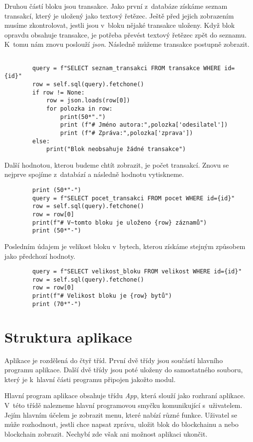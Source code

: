 \documentclass[12pt]{report}			%
\begin{document}
{Druhou částí bloku jsou transakce. Jako první z~databáze získáme seznam transakcí, který je uložený jako textový řetězec. Ještě před jejich zobrazením musíme zkontrolovat, jestli jsou v~bloku nějaké transakce uloženy. Když blok opravdu obsahuje transakce, je potřeba převést textový řetězec zpět do seznamu. K~tomu nám znovu poslouží \textit{json}. Následně můžeme transakce postupně zobrazit.
\begin{lstlisting}        
        
        query = f"SELECT seznam_transakci FROM transakce WHERE id={id}"
        row = self.sql(query).fetchone()
        if row != None:
            row = json.loads(row[0]) 
            for polozka in row:
                print(50*".")
                print (f"# Jméno autora:",polozka['odesilatel'])
                print (f"# Zpráva:",polozka['zprava'])
        else:
            print("Blok neobsahuje žádné transakce")
\end{lstlisting}
Další hodnotou, kterou budeme chtít zobrazit, je počet transakcí. Znovu se nejprve spojíme z~databází a následně hodnotu vytiskneme.

\begin{lstlisting}
        print (50*"-")
        query = f"SELECT pocet_transakci FROM pocet WHERE id={id}" 
        row = self.sql(query).fetchone()
        row = row[0]
        print(f"# V~tomto bloku je uloženo {row} záznamů")
        print (50*"-")
\end{lstlisting}

Posledním údajem je velikost bloku v~bytech, kterou získáme stejným způsobem jako předchozí hodnoty.
\begin{lstlisting}
        query = f"SELECT velikost_bloku FROM velikost WHERE id={id}" 
        row = self.sql(query).fetchone()
        row = row[0]
        print(f"# Velikost bloku je {row} bytů")
        print (70*"-")
\end{lstlisting}	
	\chapter{Struktura aplikace}{
Aplikace je rozdělená do čtyř tříd. První dvě třídy jsou součástí hlavního programu aplikace. Další dvě třídy jsou poté uloženy do samostatného souboru, který je k~hlavní části programu připojen jakožto modul. 

Hlavní program aplikace obsahuje třídu \textit{App}, která slouží jako rozhraní aplikace. V~této třídě nalezneme hlavní programovou smyčku komunikující s~uživatelem. Jejím hlavním účelem je zobrazit menu, které nabízí různé funkce. Uživatel se může rozhodnout, jestli chce napsat zprávu, uložit blok do blockchainu a nebo blockchain zobrazit. Nechybí zde však ani možnost aplikaci ukončit. 

}}
\end{document}
